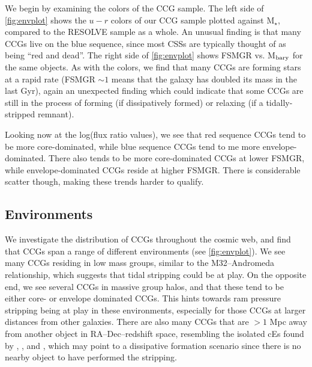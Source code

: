 \documentclass[iop,apj]{emulateapj}
\begin{document}
\noindent We begin by examining the colors of the CCG sample. The left side of \autoref{fig:envplot} shows the $u-r$ colors of our CCG sample plotted against M$_{\star}$, compared to the RESOLVE sample as a whole. An unusual finding is that many CCGs live on the blue sequence, since most CSSs are typically thought of as being ``red and dead''. The right side of \autoref{fig:envplot} shows FSMGR vs. M$_{\rm bary}$ for the same objects. As with the colors, we find that many CCGs are forming stars at a rapid rate (FSMGR $\sim1$ means that the galaxy has doubled its mass in the last Gyr), again an unexpected finding which could indicate that some CCGs are still in the process of forming (if dissipatively formed) or relaxing (if a tidally-stripped remnant).

Looking now at the log(flux ratio values), we see that red sequence CCGs tend to be more core-dominated, while blue sequence CCGs tend to me more envelope-dominated. There also tends to be more core-dominated CCGs at lower FSMGR, while envelope-dominated CCGs reside at higher FSMGR. There is considerable scatter though, making these trends harder to qualify.


\subsection{Environments}
\noindent We investigate the distribution of CCGs throughout the cosmic web, and find that CCGs span a range of different environments (see \autoref{fig:envplot}). We see many CCGs residing in low mass groups, similar to the M32--Andromeda relationship, which suggests that tidal stripping could be at play. On the opposite end, we see several CCGs in massive group halos, and that these tend to be either core- or envelope dominated CCGs. This hints towards ram pressure stripping being at play in these environments, especially for those CCGs at larger distances from other galaxies. There are also many CCGs that are $>1$ Mpc away from another object in RA--Dec--redshift space, resembling the isolated cEs found by \citet{Huxor2013}, \citet{Paudel2014}, and \citet{Chilingarian2015}, which may point to a dissipative formation scenario since there is no nearby object to have performed the stripping.
 
\end{document}
